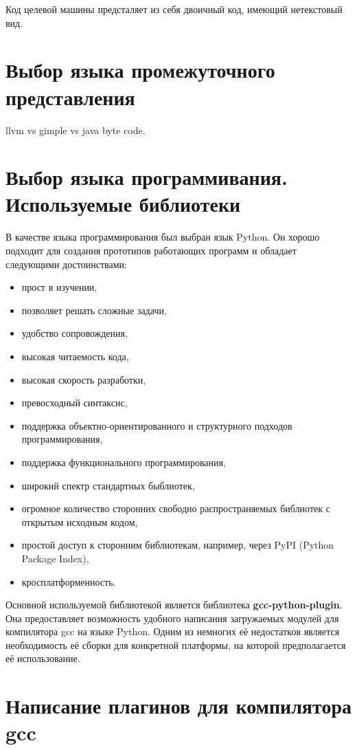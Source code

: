 Код целевой машины предсталяет из себя двоичный код, имеющий нетекстовый вид.

\section{Выбор языка промежуточного представления}

llvm vs gimple vs java byte code.


\section{Выбор языка программивания. Используемые библиотеки}

В качестве языка программирования был выбран язык Python. Он хорошо подходит для создания прототипов работающих программ и обладает следующими достоинствами:
\begin{itemize}
  \item прост в изучении,
  \item позволяет решать сложные задачи,
  \item удобство сопровождения,
  \item высокая читаемость кода,
  \item высокая скорость разработки,
  \item превосходный синтаксис,
  \item поддержка объектно-ориентированного и структурного подходов программирования,
  \item поддержка функционального программирования,
  \item широкий спектр стандартных быблиотек,
  \item огромное количество сторонних свободно распространяемых библиотек с открытым исходным кодом,
  \item простой доступ к сторонним библиотекам, например, через PyPI (Python Package Index),
  \item кросплатформенность.
\end{itemize}

Основной используемой библиотекой является библиотека \textbf{gcc-python-plugin}. Она предоставляет возможность удобного написания загружаемых модулей для компилятора gcc на языке Python. Одним из немногих её недостатков является необходимость её сборки для конкретной платформы, на которой предполагается её использование.

\section{Написание плагинов для компилятора gcc}

